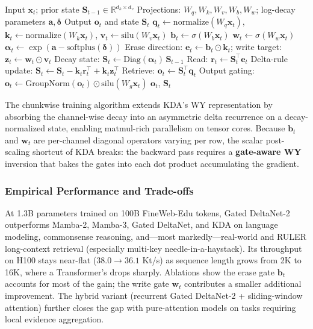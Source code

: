 \documentclass[11pt,a4paper]{article}
\begin{document}
\begin{algorithm}[H]
\caption{Gated DeltaNet-2 Recurrent Forward (Reference Form)}
\begin{algorithmic}[1]
\Require Input $\mathbf{x}_t$; prior state $\mathbf{S}_{t-1} \in \mathbb{R}^{d_k \times d_v}$
\Require Projections: $W_q, W_k, W_v, W_b, W_w$; log-decay parameters $\mathbf{a}, \boldsymbol{\delta}$
\Ensure Output $\mathbf{o}_t$ and state $\mathbf{S}_t$
\State $\mathbf{q}_t \gets \mathrm{normalize}(W_q \mathbf{x}_t)$, $\mathbf{k}_t \gets \mathrm{normalize}(W_k \mathbf{x}_t)$, $\mathbf{v}_t \gets \mathrm{silu}(W_v \mathbf{x}_t)$
\State $\mathbf{b}_t \gets \sigma(W_b \mathbf{x}_t)$ 
\State $\mathbf{w}_t \gets \sigma(W_w \mathbf{x}_t)$ 
\State $\boldsymbol{\alpha}_t \gets \exp(\mathbf{a} - \mathrm{softplus}(\boldsymbol{\delta}))$ 
\State Erase direction: $\mathbf{e}_t \gets \mathbf{b}_t \odot \mathbf{k}_t$; write target: $\mathbf{z}_t \gets \mathbf{w}_t \odot \mathbf{v}_t$
\State Decay state: $\mathbf{S}_t \gets \mathrm{Diag}(\boldsymbol{\alpha}_t)\, \mathbf{S}_{t-1}$
\State Read: $\mathbf{r}_t \gets \mathbf{S}_t^\top \mathbf{e}_t$ 
\State Delta-rule update: $\mathbf{S}_t \gets \mathbf{S}_t - \mathbf{k}_t \mathbf{r}_t^\top + \mathbf{k}_t \mathbf{z}_t^\top$
\State Retrieve: $\mathbf{o}_t \gets \mathbf{S}_t^\top \mathbf{q}_t$
\State Output gating: $\mathbf{o}_t \gets \mathrm{GroupNorm}(\mathbf{o}_t) \odot \mathrm{silu}(W_g \mathbf{x}_t)$
\State \Return $\mathbf{o}_t$, $\mathbf{S}_t$
\end{algorithmic}
\end{algorithm}

The chunkwise training algorithm extends KDA's WY representation by absorbing the channel-wise decay into an asymmetric delta recurrence on a decay-normalized state, enabling matmul-rich parallelism on tensor cores. Because $\mathbf{b}_t$ and $\mathbf{w}_t$ are per-channel diagonal operators varying per row, the scalar post-scaling shortcut of KDA breaks: the backward pass requires a \textbf{gate-aware WY} inversion that bakes the gates into each dot product accumulating the gradient.

\subsubsection{Empirical Performance and Trade-offs}

At 1.3B parameters trained on 100B FineWeb-Edu tokens, Gated DeltaNet-2 outperforms Mamba-2, Mamba-3, Gated DeltaNet, and KDA on language modeling, commonsense reasoning, and---most markedly---real-world and RULER long-context retrieval (especially multi-key needle-in-a-haystack). Its throughput on H100 stays near-flat ($38.0 \to 36.1$ Kt/s) as sequence length grows from 2K to 16K, where a Transformer's drops sharply. Ablations show the erase gate $\mathbf{b}_t$ accounts for most of the gain; the write gate $\mathbf{w}_t$ contributes a smaller additional improvement. The hybrid variant (recurrent Gated DeltaNet-2 + sliding-window attention) further closes the gap with pure-attention models on tasks requiring local evidence aggregation.
\end{document}
